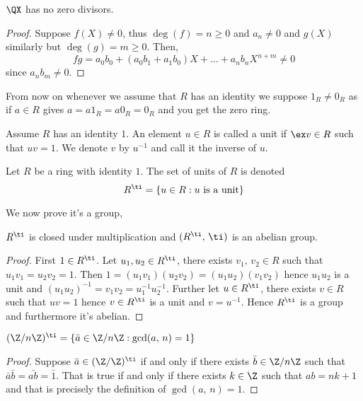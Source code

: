 \begin{nprop}
   $\QX$ has no zero divisors.
\end{nprop}
\begin{proof}
  Suppose $f(X) \ne 0$, thus $\deg(f) = n \ge 0$ and $a_n \ne 0$ and $g(X)$ similarly but $\deg(g) = m \ge 0$. Then,
  $$ fg = a_0b_0 + (a_0b_1 + a_1b_0)X + \dots + a_nb_n X^{n+m} \ne 0$$
  since $a_n b_m \ne 0$.
\end{proof}

From now on whenever we assume that $R$ has an identity we suppose $1_R \ne 0_R$ as if $a \in R$ gives $a = a1_R = a0_R = 0_R$ and you get the zero ring.

\begin{ndefi}[Unit]
  Assume $R$ has an identity $1$. An element $u \in R$ is called a unit if $\ex v \in R$ such that $uv = 1$. We denote $v$ by $u^{-1}$ and call it the inverse of $u$.
\end{ndefi}

\begin{ndefi}
  Let $R$ be a ring with identity $1$. The set of units of $R$ is denoted
  $$ R^\ti = \{u \in R : u \text{ is a unit}\} $$
\end{ndefi}

We now prove it's a group,

\begin{nlemma}
  $R^\ti$ is closed under multiplication and $(R^\ti,\,\ti)$ is an abelian group.
\end{nlemma}
\begin{proof}
  First $1 \in R^\ti$. Let $u_1, u_2 \in R^\ti$, there exists $v_1,\,v_2 \in R$ such that $u_1v_1 = u_2v_2 = 1$. Then $1 = (u_1v_1)(u_2v_2) = (u_1u_2)(v_1v_2)$ hence $u_1u_2$ is a unit and $(u_1u_2)^{-1} = v_1v_2 = u_1^{-1}u_2^{-1}$.
  Further let $u \in R^\ti$, there exists $v \in R$ such that $uv = 1$ hence $v \in R^\ti$ is a unit and $v= u^{-1}$. Hence $R^\ti$ is a group and furthermore it's abelian.
\end{proof}

\begin{nprop}
   $(\Z/n\Z)^\ti = \{\bar a \in \Z/n\Z : \gcd(a,\,n) = 1\}$
\end{nprop}
\begin{proof}
  Suppose $\bar a \in (\Z/\Z)^\ti$ if and only if there exists $\bar b \in \Z/n\Z$ such that $\bar{a}\bar{b} = \bar{ab} = \bar 1$. That is true if and only if there exists $k \in \Z$ such that $ab = nk + 1$ and that is precisely the definition of $\gcd(a,\,n) = 1$.
\end{proof}
